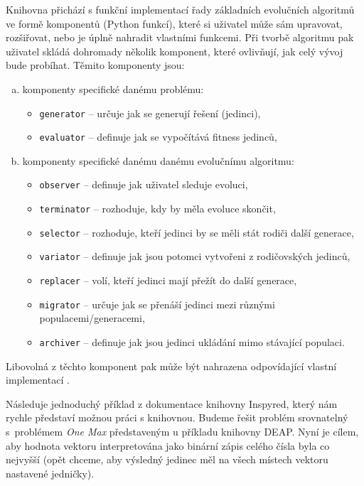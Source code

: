 Knihovna přichází s funkční implementací řady základních 
evolučních algoritmů ve formě komponentů (Python funkcí), které si uživatel
může sám upravovat, rozšiřovat, nebo je úplně nahradit vlastními funkcemi. Při
tvorbě algoritmu pak uživatel skládá dohromady několik komponent, které
ovlivňují, jak celý vývoj bude probíhat.
Těmito komponenty jsou:
\begin{enumerate}[a)]
    \item komponenty specifické danému problému:
        \begin{itemize}
            \item \texttt{generator} -- určuje jak se generují řešení
                (jedinci),
            \item \texttt{evaluator} -- definuje jak se vypočítává fitness
                jedinců,
        \end{itemize}
    \item komponenty specifické danému danému evolučnímu algoritmu:
        \begin{itemize}
            \item \texttt{observer} -- definuje jak uživatel sleduje evoluci,
            \item \texttt{terminator} -- rozhoduje, kdy by měla evoluce
                skončit,
            \item \texttt{selector} -- rozhoduje, kteří jedinci by se měli stát
                rodiči další generace,
            \item \texttt{variator} -- definuje jak jsou potomci vytvořeni z
                rodičovských jedinců,
            \item \texttt{replacer} -- volí, kteří jedinci mají přežít do další
                generace,
            \item \texttt{migrator} -- určuje jak se přenáší jedinci mezi
                různými \\populacemi/generacemi,
            \item \texttt{archiver} -- definuje jak jsou jedinci ukládání mimo
                stávající populaci.
        \end{itemize}
\end{enumerate}

Libovolná z těchto komponent pak může být nahrazena odpovídající vlastní
implementací \citep{tonda2020inspyred}.

Následuje jednoduchý příklad z dokumentace knihovny Inspyred, který nám rychle
představí možnou práci s knihovnou. Budeme řešit problém srovnatelný
s~problémem \emph{One Max} představeným u příkladu knihovny DEAP. Nyní je
cílem, aby hodnota vektoru interpretována jako binární zápis celého čísla byla
co nejvyšší (opět chceme, aby výsledný jedinec měl na všech místech vektoru
nastavené jedničky). 

